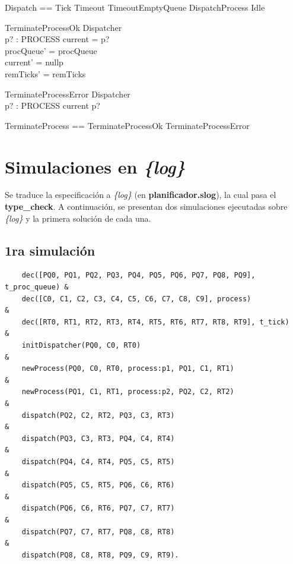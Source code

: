\documentclass{article}
\begin{document}
\begin{zed}
    Dispatch == Tick \lor Timeout \lor TimeoutEmptyQueue \lor DispatchProcess \lor Idle
\end{zed}

\begin{schema}{TerminateProcessOk}
    \Delta Dispatcher \\
    p? : PROCESS
\where
    current = p? \\
    procQueue' = procQueue \\
    current' = nullp \\
    remTicks' = remTicks
\end{schema}

\begin{schema}{TerminateProcessError}
    \Xi Dispatcher \\
    p? : PROCESS
\where
    current \neq p?
\end{schema}

\begin{zed}
    TerminateProcess == TerminateProcessOk \lor TerminateProcessError
\end{zed}


\section{Simulaciones en \textit{\{log\}}}

Se traduce la especificación a \textit{\{log\}} (en \textbf{planificador.slog}), la cual pasa el \textbf{type\_check}. A continuación, se presentan dos simulaciones ejecutadas sobre \textit{\{log\}} y la primera solución de cada una.


\subsection*{1ra simulación}

\begin{verbatim}
    dec([PQ0, PQ1, PQ2, PQ3, PQ4, PQ5, PQ6, PQ7, PQ8, PQ9], t_proc_queue) &
    dec([C0, C1, C2, C3, C4, C5, C6, C7, C8, C9], process)                &
    dec([RT0, RT1, RT2, RT3, RT4, RT5, RT6, RT7, RT8, RT9], t_tick)       &
    initDispatcher(PQ0, C0, RT0)                                          & 
    newProcess(PQ0, C0, RT0, process:p1, PQ1, C1, RT1)                    & 
    newProcess(PQ1, C1, RT1, process:p2, PQ2, C2, RT2)                    & 
    dispatch(PQ2, C2, RT2, PQ3, C3, RT3)                                  & 
    dispatch(PQ3, C3, RT3, PQ4, C4, RT4)                                  & 
    dispatch(PQ4, C4, RT4, PQ5, C5, RT5)                                  & 
    dispatch(PQ5, C5, RT5, PQ6, C6, RT6)                                  & 
    dispatch(PQ6, C6, RT6, PQ7, C7, RT7)                                  & 
    dispatch(PQ7, C7, RT7, PQ8, C8, RT8)                                  & 
    dispatch(PQ8, C8, RT8, PQ9, C9, RT9).
\end{verbatim}
\end{document}
